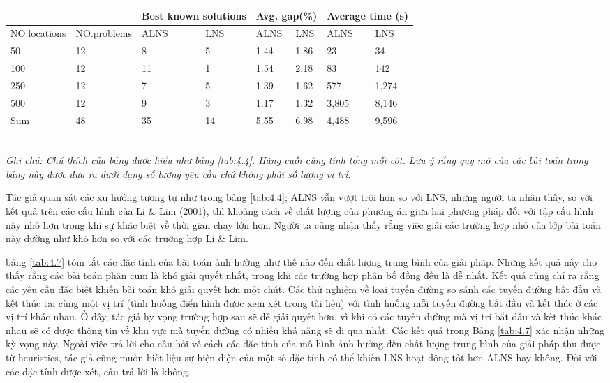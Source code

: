 
\begin{table}[caption={Tóm tắt kết quả thu được từ các cấu hình mới}, label=tab:4.5]
    \begin{tabular}{@{}llllllll@{}}
        \toprule
                    &           & \multicolumn{2}{l}{\footnotesize{Best known solutions}}& \multicolumn{2}{l}{\footnotesize{Avg. gap(\%)}}& \multicolumn{2}{l}{\footnotesize{Average time (s)}} \\ 
        \hline            
        \footnotesize{NO.locations}&\scriptsize{NO.problems}&\footnotesize{ALNS}&\footnotesize{LNS}&\footnotesize{ALNS}&\footnotesize{LNS}&\footnotesize{ALNS}&\footnotesize{LNS} \\ \midrule
        50  &12 &8  &5 &1.44 &1.86 &23    &34  \\
        100 &12 &11 &1 &1.54 &2.18 &83    &142  \\
        250 &12 &7  &5 &1.39 &1.62 &577   &1,274 \\ 
        500 &12 &9  &3 &1.17 &1.32 &3,805 &8,146 \\     
        Sum &48 &35 &14&5.55 &6.98 &4,488 &9,596 \\     \bottomrule
        \end{tabular} \\
        \justify
        \textit{Ghi chú: Chú thích của bảng được hiểu như bảng \ref{tab:4.4}. Hàng cuối cùng tính tổng mỗi cột. Lưu ý rằng quy mô của các bài toán trong bảng này được đưa ra dưới dạng số lượng yêu cầu chứ không phải số lượng vị trí.}
\end{table}

Tác giả quan sát các xu hướng tương tự như trong bảng \ref{tab:4.4}; ALNS vẫn vượt trội hơn so với LNS, nhưng người ta nhận thấy, so với kết quả trên các cấu hình của Li \& Lim (2001), thì khoảng cách về chất lượng của phương án giữa hai phương pháp đối với tập cấu hình này nhỏ hơn trong khi sự khác biệt về thời gian chạy lớn hơn. Người ta cũng nhận thấy rằng việc giải các trường hợp nhỏ của lớp bài toán này dường như khó hơn so với các trường hợp Li \& Lim.

bảng \ref{tab:4.7} tóm tắt các đặc tính của bài toán ảnh hưởng như thế nào đến chất lượng trung bình của giải pháp. Những kết quả này cho thấy rằng các bài toán phân cụm là khó giải quyết nhất, trong khi các trường hợp phân bố đồng đều là dễ nhất. Kết quả cũng chỉ ra rằng các yêu cầu đặc biệt khiến bài toán khó giải quyết hơn một chút. Các thử nghiệm về loại tuyến đường so sánh các tuyến đường bắt đầu và kết thúc tại cùng một vị trí (tình huống điển hình được xem xét trong tài liệu) với tình huống mỗi tuyến đường bắt đầu và kết thúc ở các vị trí khác nhau. Ở đây, tác giả hy vọng trường hợp sau sẽ dễ giải quyết hơn, vì khi có các tuyến đường mà vị trí bắt đầu và kết thúc khác nhau sẽ có được thông tin về khu vực mà tuyến đường có nhiều khả năng sẽ đi qua nhất. Các kết quả trong Bảng \ref{tab:4.7} xác nhận những kỳ vọng này.
Ngoài việc trả lời cho câu hỏi về cách các đặc tính của mô hình ảnh hưởng đến chất lượng trung bình của giải pháp thu được từ heuristics, tác giả cũng muốn biết liệu sự hiện diện của một số đặc tính có thể khiến LNS hoạt động tốt hơn ALNS hay không. Đối với các đặc tính được xét, câu trả lời là không.

